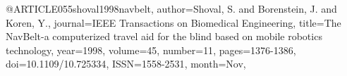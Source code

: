 @ARTICLE{055shoval1998navbelt,
author={Shoval, S. and Borenstein, J. and Koren, Y.},
journal={IEEE Transactions on Biomedical Engineering}, 
title={The NavBelt-a computerized travel aid for the blind based on mobile robotics technology}, 
year={1998},
volume={45},
number={11},
pages={1376-1386},
doi={10.1109/10.725334},
ISSN={1558-2531},
month={Nov},}